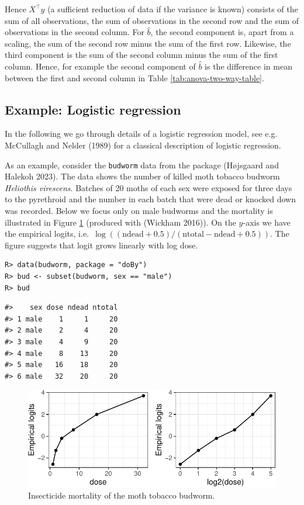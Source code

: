 Hence \(X^\top y\) (a sufficient reduction of data if the variance is
known) consists of the sum of all observations, the sum of
observations in the second row and the sum of observations in the
second column. For \(\hat{b}\), the second component is, apart from a
scaling, the sum of the second row minus the sum of the first
row. Likewise, the third component is the sum of the second column
minus the sum of the first column. Hence, for example the second
component of \(\hat{b}\) is the difference in mean between the first and
second column in Table \ref{tab:anova-two-way-table}.

\hypertarget{example-logistic-regression}{%
\subsection{Example: Logistic regression}\label{example-logistic-regression}}

In the following we go through details of a logistic regression model,
see e.g. McCullagh and Nelder (1989) for a classical description of logistic
regression.

As an example, consider the \texttt{budworm} data from the  package (Højsgaard and Halekoh 2023).
The data shows the number of killed moth tobacco budworm
\emph{Heliothis virescens}. Batches of 20 moths of each sex were
exposed for three days to the pyrethroid and the number in each batch
that were dead or knocked down was recorded.
Below we focus only on male budworms and the mortality is illustrated
in Figure \ref{fig:budworm} (produced with  (Wickham 2016)). On the \(y\)-axis we have the empirical
logits, i.e.~\(\log((\text{ndead} + 0.5)/(\text{ntotal}-\text{ndead} + 0.5))\). The figure suggests that logit grows linearly with log dose.

\begin{verbatim}
R> data(budworm, package = "doBy")
R> bud <- subset(budworm, sex == "male")
R> bud
\end{verbatim}

\begin{verbatim}
#>    sex dose ndead ntotal
#> 1 male    1     1     20
#> 2 male    2     4     20
#> 3 male    4     9     20
#> 4 male    8    13     20
#> 5 male   16    18     20
#> 6 male   32    20     20
\end{verbatim}

\begin{figure}
\centering
\includegraphics{budworm-1.pdf}
\caption{\label{fig:budworm}Insecticide mortality of the moth tobacco budworm.}
\end{figure}

